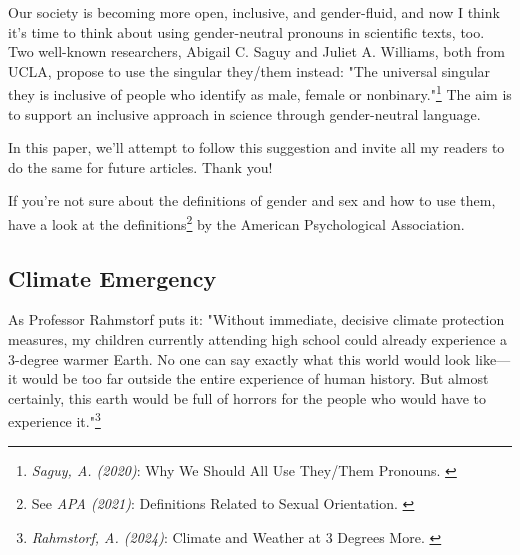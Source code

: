 Our society is becoming more open, inclusive, and gender-fluid, and now I think it's time to think about using gender-neutral pronouns in scientific texts, too. Two well-known researchers, Abigail C. Saguy and Juliet A. Williams, both from UCLA, propose to use the singular they/them instead: "The universal singular they is inclusive of people who identify as male, female or nonbinary."\footnote{\textit{Saguy, A. (2020)}: Why We Should All Use They/Them Pronouns. \cite{pronouns}} The aim is to support an inclusive approach in science through gender-neutral language. 

In this paper, we'll attempt to follow this suggestion and invite all my readers to do the same for future articles. Thank you!

If you're not sure about the definitions of gender and sex and how to use them, have a look at the definitions\footnote{See \textit{APA (2021)}: Definitions Related to Sexual Orientation. \cite{apaDefinitions}} by the American Psychological Association.

\subsection{Climate Emergency}

As Professor Rahmstorf puts it: "Without immediate, decisive climate protection measures, my children currently attending high school could already experience a 3-degree warmer Earth. No one can say exactly what this world would look like—it would be too far outside the entire experience of human history. But almost certainly, this earth would be full of horrors for the people who would have to experience it."\footnote{\textit{Rahmstorf, A. (2024)}: Climate and Weather at 3 Degrees More. \cite{3dgreesMore}}
